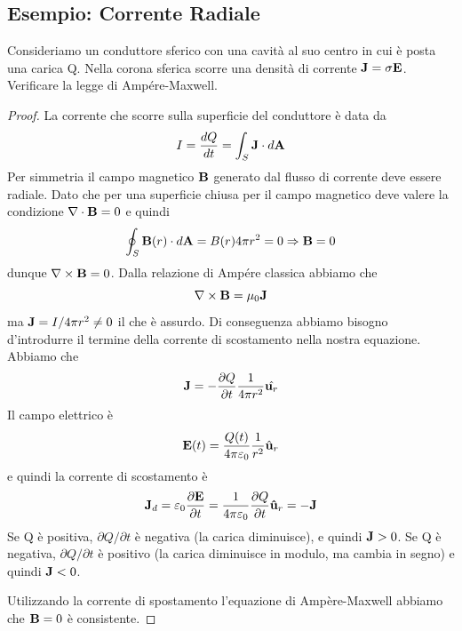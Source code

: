 \subsection{Esempio: Corrente Radiale}

Consideriamo un conduttore sferico con una cavit\`a al suo centro in cui \`e posta una carica Q. Nella corona sferica scorre una densit\`a di corrente $\bold{J} = \sigma \bold{E}$. Verificare la legge di Amp\'ere-Maxwell.

\begin{proof}
	La corrente che scorre sulla superficie del conduttore \`e data da
	\begin{equation*}
		I = \frac{dQ}{dt} = \int_{S} \bold{J} \cdot d \bold{A}
	\end{equation*}
Per simmetria il campo magnetico $\bold{B}$ generato dal flusso di corrente deve essere radiale. Dato che per una superficie chiusa per il campo magnetico deve valere la condizione  $\nabla \cdot \bold{B} = 0 $ e quindi 
\begin{equation*}
	\oint_{S} \bold{B}(r) \cdot d\bold{A} = B(r)4\pi r^2 = 0 \Rightarrow  \bold{B} = 0
\end{equation*}
dunque $\nabla \times \bold{B} = 0$. Dalla relazione di Amp\'ere classica abbiamo che 
\begin{equation*}
	\nabla \times \bold{B} = \mu_0 \bold{J}
\end{equation*}
ma $\bold{J} = I / 4 \pi r^2 \neq 0$ il che \`e assurdo. Di conseguenza abbiamo bisogno d'introdurre il termine della corrente di scostamento nella nostra equazione. Abbiamo che 
\begin{equation*}
	\bold{J} = - \frac{\partial Q}{\partial t} \frac{1}{4 \pi r^2} \hat{\bold{u}_{r}}
\end{equation*}
Il campo elettrico \`e 
\begin{equation*}
	\bold{E}(t) = \frac{Q(t)}{4 \pi \varepsilon_0} \frac{1}{r^2}\hat{\bold{u}}_r
\end{equation*}
e quindi la corrente di scostamento \`e 
\begin{equation*}
	\bold{J}_d = \varepsilon_0 \frac{\partial \bold{E}}{\partial t} = \frac{1}{4\pi \varepsilon_0}\frac{\partial Q}{\partial t} \bold{\hat{u}}_r = -\bold{J}
\end{equation*}
Se Q \`e positiva, $\partial Q / \partial t$ \`e negativa (la carica diminuisce), e quindi $\bold{J} >0$.
Se Q \`e negativa, $\partial Q / \partial t$ \`e positivo (la carica diminuisce in modulo, ma cambia in segno) e quindi $\bold{J} < 0$.

Utilizzando la corrente di spostamento l'equazione di Amp\`ere-Maxwell abbiamo che $\bold{B} =0 $ \`e consistente. 

\end{proof}

